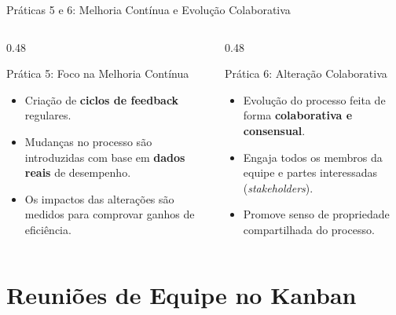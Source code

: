 \documentclass[aspectratio=169, 9pt]{beamer}
\begin{document}
\begin{frame}{Práticas 5 e 6: Melhoria Contínua e Evolução Colaborativa}
  \begin{columns}[T]
    \begin{column}{0.48\textwidth}
      \begin{alertblock}{Prática 5: Foco na Melhoria Contínua}
        \begin{itemize}
          \item Criação de \textbf{ciclos de feedback} regulares.
          \item Mudanças no processo são introduzidas com base em \textbf{dados reais} de desempenho.
          \item Os impactos das alterações são medidos para comprovar ganhos de eficiência.
        \end{itemize}
      \end{alertblock}
    \end{column}

    \begin{column}{0.48\textwidth}
      \begin{block}{Prática 6: Alteração Colaborativa}
        \begin{itemize}
          \item Evolução do processo feita de forma \textbf{colaborativa e consensual}.
          \item Engaja todos os membros da equipe e partes interessadas (\textit{stakeholders}).
          \item Promove senso de propriedade compartilhada do processo.
        \end{itemize}
      \end{block}
    \end{column}
  \end{columns}
\end{frame}

\section{Reuniões de Equipe no Kanban}
\end{document}
